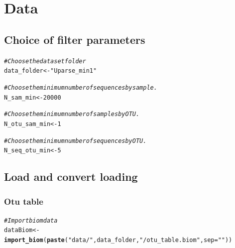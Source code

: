 \documentclass[12pt]{article}\usepackage[]{graphicx}\usepackage[]{color}
\makeatletter
\newcommand{\hlnum}[1]{\textcolor[rgb]{0.686,0.059,0.569}{#1}}%
\newcommand{\hlstr}[1]{\textcolor[rgb]{0.192,0.494,0.8}{#1}}%
\newcommand{\hlcom}[1]{\textcolor[rgb]{0.678,0.584,0.686}{\textit{#1}}}%
\newcommand{\hlstd}[1]{\textcolor[rgb]{0.345,0.345,0.345}{#1}}%
\newcommand{\hlkwb}[1]{\textcolor[rgb]{0.69,0.353,0.396}{#1}}%
\newcommand{\hlkwc}[1]{\textcolor[rgb]{0.333,0.667,0.333}{#1}}%
\newcommand{\hlkwd}[1]{\textcolor[rgb]{0.737,0.353,0.396}{\textbf{#1}}}%
\newenvironment{kframe}{%
 \def\at@end@of@kframe{}%
 \ifinner\ifhmode%
  \def\at@end@of@kframe{\end{minipage}}%
  \begin{minipage}{\columnwidth}%
 \fi\fi%
 \def\FrameCommand##1{\hskip\@totalleftmargin \hskip-\fboxsep
 \colorbox{shadecolor}{##1}\hskip-\fboxsep
     \hskip-\linewidth \hskip-\@totalleftmargin \hskip\columnwidth}%
 \MakeFramed {\advance\hsize-\width
   \@totalleftmargin\z@ \linewidth\hsize
   \@setminipage}}%
 {\par\unskip\endMakeFramed%
 \at@end@of@kframe}
\newenvironment{knitrout}{}{} %
\numberwithin{figure}{section}
\makeatother
\begin{document}
\section{Data}

  \subsection{Choice of filter parameters}
  \label{section:filter}
\begin{knitrout}\small
{}\color{fgcolor}\begin{kframe}
\begin{alltt}
\hlcom{#Choose the dataset folder}
\hlstd{data_folder} \hlkwb{<-} \hlstr{"Uparse_min1"}

\hlcom{#Choose the minimum number of sequences by sample.}
\hlstd{N_sam_min} \hlkwb{<-} \hlnum{20000}

\hlcom{#Choose the minimum number of samples by OTU.}
\hlstd{N_otu_sam_min} \hlkwb{<-} \hlnum{1}

\hlcom{#Choose the minimum number of sequences by OTU.}
\hlstd{N_seq_otu_min} \hlkwb{<-} \hlnum{5}
\end{alltt}
\end{kframe}
\end{knitrout}


  \subsection{Load and convert loading}
  \subsubsection{Otu table}
\begin{knitrout}\small
{}\color{fgcolor}\begin{kframe}
\begin{alltt}
\hlcom{#Import biom data}
\hlstd{dataBiom}   \hlkwb{<-} \hlkwd{import_biom}\hlstd{(}\hlkwd{paste}\hlstd{(}\hlstr{"data/"}\hlstd{, data_folder,} \hlstr{"/otu_table.biom"}\hlstd{,} \hlkwc{sep}\hlstd{=}\hlstr{""}\hlstd{))}
\end{alltt}
\end{kframe}
\end{knitrout}
\end{document}
